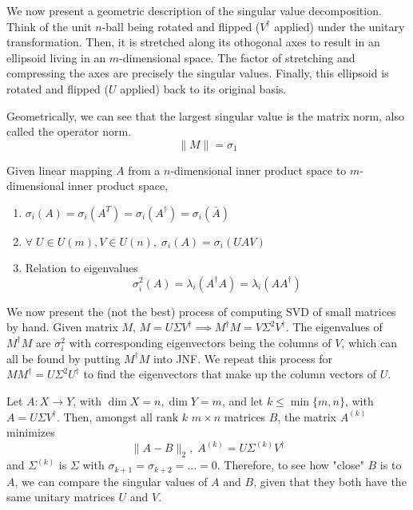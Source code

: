   We now present a geometric description of the singular value decomposition. Think of the unit $n$-ball being rotated and flipped ($V^\dagger$ applied) under the unitary transformation. Then, it is stretched along its othogonal axes to result in an ellipsoid living in an $m$-dimensional space. The factor of stretching and compressing the axes are precisely the singular values. Finally, this ellipsoid is rotated and flipped ($U$ applied) back to its original basis. 

  \begin{theorem}
    Geometrically, we can see that the largest singular value is the matrix norm, also called the operator norm. 
    \begin{equation}
      \|M\| = \sigma_1
    \end{equation}
  \end{theorem}

  \begin{theorem} 
    Given linear mapping $A$ from a $n$-dimensional inner product space to $m$-dimensional inner product space, 
    \begin{enumerate}
      \item $\sigma_i(A) = \sigma_i (A^T) = \sigma_i (A^\dagger) = \sigma_i (\bar{A})$

      \item $\forall \; U \in U(m), V \in U(n), \; \sigma_i (A) = \sigma_i (U A V)$

      \item Relation to eigenvalues
      \begin{equation}
        \sigma_i^2(A) = \lambda_i (A^\dagger A) = \lambda_i (A A^\dagger)
      \end{equation}
    \end{enumerate}
  \end{theorem}

  We now present the (not the best) process of computing SVD of small matrices by hand. Given matrix $M$, $M = U \Sigma V^\dagger \implies M^\dagger M = V \Sigma^2 V^\dagger$. The eigenvalues of $M^\dagger M$ are $\sigma_i^2$ with corresponding eigenvectors being the columns of $V$, which can all be found by putting $M^\dagger M$ into JNF. We repeat this process for $M M^\dagger = U \Sigma^2 U^\dagger$ to find the eigenvectors that make up the column vectors of $U$. 

  \begin{theorem}
    Let $A: X \longrightarrow Y$, with $\dim{X} = n, \dim{Y} = m$, and let $k \leq \min{\{m, n\}}$, with $A = U \Sigma V^\dagger$. Then, amongst all rank $k$ $m \times n$ matrices $B$, the matrix $A^{(k)}$ minimizes 
    \begin{equation}
      \|A-B\|_2, \; A^{(k)} = U \Sigma^{(k)} V^\dagger
    \end{equation}
    and $\Sigma^{(k)}$ is $\Sigma$ with $\sigma_{k+1} = \sigma_{k+2} = ... = 0$. Therefore, to see how "close" $B$ is to $A$, we can compare the singular values of $A$ and $B$, given that they both have the same unitary matrices $U$ and $V$. 
  \end{theorem}

